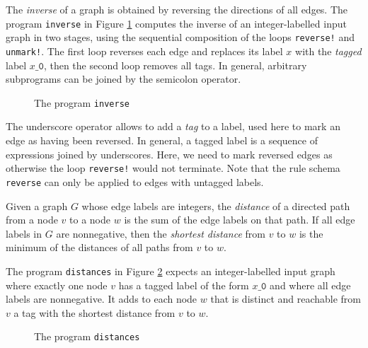 \begin{example}[Inverse]
\label{ex:inverse}

The \emph{inverse} of a graph is obtained by reversing the directions of all edges. The  program \texttt{inverse} in Figure \ref{fig:inverse} computes the inverse of an integer-labelled input graph in two stages, using the sequential composition of the loops  \texttt{reverse!} and \texttt{unmark!}. The first loop reverses each edge and replaces its label $x$ with the \emph{tagged}\/ label $x\_\mathtt{0}$, then the second loop removes all tags. In general, arbitrary subprograms can be joined by the semicolon operator. 

\begin{figure}[htb]
 \begin{center}
  
 \end{center}
\caption{The program \texttt{inverse}\label{fig:inverse}}
\end{figure}

The underscore operator allows to add a \emph{tag} to a label, used here to mark an edge as having been reversed. In general, a tagged label is a sequence of expressions joined by underscores. Here, we need to mark reversed edges as otherwise the loop \texttt{reverse!} would not terminate. Note that the rule schema \texttt{reverse} can only be applied to edges with untagged labels. 
\end{example}

\begin{example}
\label{ex:distances}
Given a graph $G$ whose edge labels are integers, the \emph{distance} of a directed path from a node $v$ to a node $w$ is the sum of the edge labels on that path. If all edge labels in $G$ are nonnegative, then the \emph{shortest distance} from $v$ to $w$ is the minimum of the distances of all paths from $v$ to $w$. 

The program \texttt{distances} in Figure \ref{fig:distances} expects an integer-labelled input graph where exactly one node $v$ has a tagged label of the form $x\_\mathtt{0}$ and where all edge labels are nonnegative. It adds to each node $w$ that is distinct and reachable from $v$ a tag with the shortest distance from $v$ to $w$. 

\begin{figure}[htb]
 \begin{center}
  
 \end{center}
\caption{The program \texttt{distances}\label{fig:distances}}
\end{figure}
\end{example}

